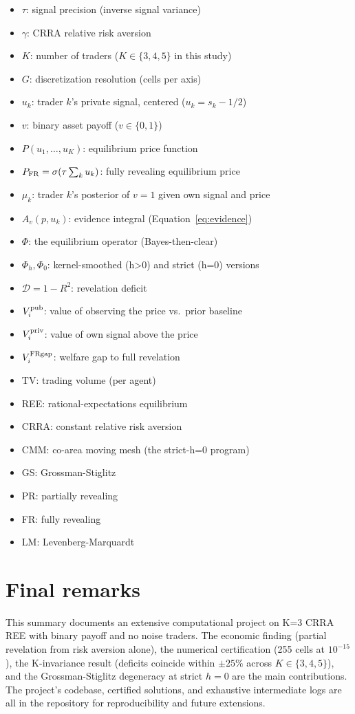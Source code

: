 \documentclass[11pt]{article}
\newcommand{\1}{\mathbf{1}}
\newcommand{\deficit}{\mathcal{D}}
\newcommand{\Vipub}{V_{i}^{\rm pub}}
\newcommand{\Vipriv}{V_{i}^{\rm priv}}
\newcommand{\ViFR}{V_{i}^{\rm FRgap}}
\newcommand{\PFR}{P_{\rm FR}}
\begin{document}
\begin{itemize}
\item $\tau$: signal precision (inverse signal variance)
\item $\gamma$: CRRA relative risk aversion
\item $K$: number of traders ($K \in \{3, 4, 5\}$ in this study)
\item $G$: discretization resolution (cells per axis)
\item $u_k$: trader $k$'s private signal, centered ($u_k = s_k - 1/2$)
\item $v$: binary asset payoff ($v \in \{0, 1\}$)
\item $P(u_1, \ldots, u_K)$: equilibrium price function
\item $\PFR = \sigma(\tau \sum_k u_k)$: fully revealing equilibrium price
\item $\mu_k$: trader $k$'s posterior of $v=1$ given own signal and price
\item $A_v(p, u_k)$: evidence integral (Equation~\ref{eq:evidence})
\item $\Phi$: the equilibrium operator (Bayes-then-clear)
\item $\Phi_h, \Phi_0$: kernel-smoothed (h>0) and strict (h=0) versions
\item $\deficit = 1 - R^2$: revelation deficit
\item $\Vipub$: value of observing the price vs.\ prior baseline
\item $\Vipriv$: value of own signal above the price
\item $\ViFR$: welfare gap to full revelation
\item $\mathrm{TV}$: trading volume (per agent)
\item REE: rational-expectations equilibrium
\item CRRA: constant relative risk aversion
\item CMM: co-area moving mesh (the strict-h=0 program)
\item GS: Grossman-Stiglitz
\item PR: partially revealing
\item FR: fully revealing
\item LM: Levenberg-Marquardt
\end{itemize}

\section{Final remarks}

This summary documents an extensive computational project on K=3 CRRA REE
with binary payoff and no noise traders.  The economic finding (partial
revelation from risk aversion alone), the numerical certification
(255 cells at $10^{-15}$), the K-invariance result (deficits coincide
within $\pm 25\%$ across $K \in \{3,4,5\}$), and the Grossman-Stiglitz
degeneracy at strict $h=0$ are the main contributions.  The project's
codebase, certified solutions, and exhaustive intermediate logs are all
in the repository for reproducibility and future extensions.
\end{document}
